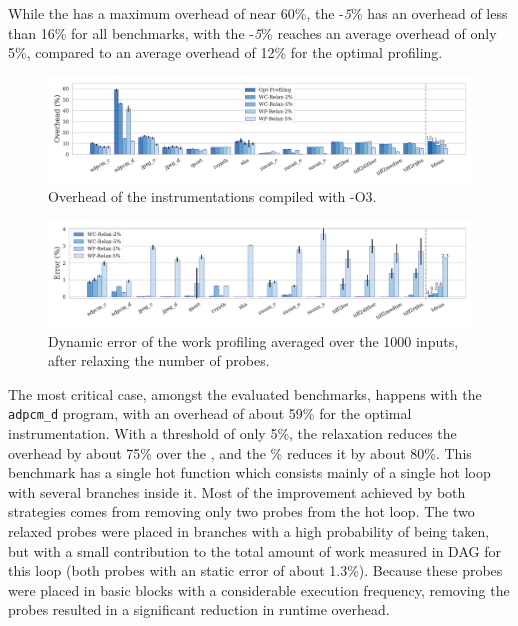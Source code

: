 
While the \OptProf has a maximum overhead of near 60\%, the \WCRelax-\textit{5}\% has an overhead of
less than 16\% for all benchmarks, with the \WPRelax-\textit{5}\% reaches an average overhead of only 5\%,
compared to an average overhead of 12\% for the optimal profiling.

\begin{figure}[t!]
    \centering
    \includegraphics[width=\textwidth]{figs/overhead-O3.pdf}
    \caption{Overhead of the instrumentations compiled with {\flagstype -O3}.}
    \vspace{-3mm}
    \label{fig:overhead-O3}
\end{figure}
\begin{figure}[t!]
    \centering
    \includegraphics[width=\textwidth]{figs/error-O3.pdf}
    \caption{Dynamic error of the work profiling averaged over the 1000 inputs, after relaxing the number of probes.}
    \vspace{-3mm}
    \label{fig:error-O3}
\end{figure}


The most critical case, amongst the evaluated benchmarks, happens with the
\texttt{adpcm\_d} program, with an overhead of about 59\% for the optimal
instrumentation.
With a threshold of only 5\%, the \WCRelaxLower relaxation reduces
the overhead by about 75\% over the \OptProf,
and the \% reduces it by about 80\%.
This benchmark has a single hot function
which consists mainly of a single hot loop with several branches inside it. %
Most of the improvement achieved by both strategies comes from removing only two probes from the hot loop. The two relaxed probes were
placed in branches with a high probability of being taken, but with a small contribution to the total amount of
work measured in DAG for this loop (both probes with an static error of about 1.3\%). Because these probes were placed in basic blocks with
a considerable execution frequency, removing the probes resulted in a significant reduction in runtime overhead.

